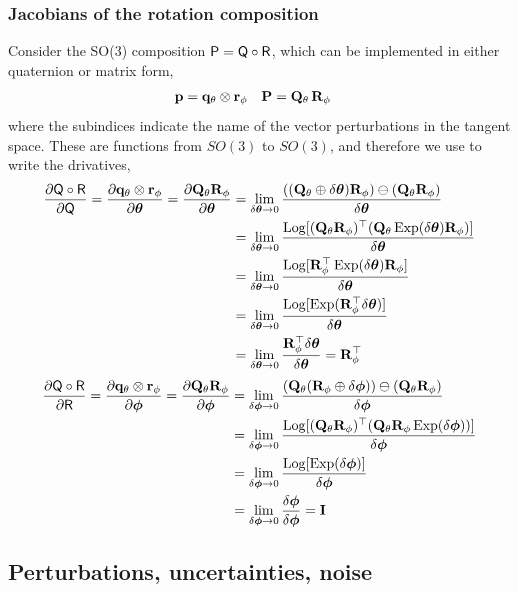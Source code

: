 \subsubsection{Jacobians of the rotation composition}

Consider the SO(3) composition $\mathsf P=\mathsf Q\circ\mathsf R$, which can be implemented in either quaternion or matrix form,
%
\begin{align}
{\bf p} &= {\bf q}_\theta\otimes{\bf r}_\phi & {\bf P} &= {\bf Q}_\theta\,{\bf R}_\phi
\end{align}
%
where the subindices indicate the name of the vector perturbations in the tangent space. 
These are functions from $SO(3)$ to $SO(3)$, and therefore we use  to write the drivatives,
%
\begin{align*}
\frac{\partial\mathsf Q\circ\mathsf R}{\partial\mathsf Q} 
= \frac{\partial{\bf q}_\theta\otimes{\bf r}_\phi}{\partial{\bm \theta}} 
= \frac{\partial{\bf Q}_\theta {\bf R}_\phi}{\partial{\bm \theta}} 
&= \lim_{\delta{\bm \theta}\to 0}\frac{(({\bf Q}_\theta\oplus\delta{\bm \theta}){\bf R}_\phi)\ominus({\bf Q}_\theta{\bf R}_\phi)}{\delta{\bm \theta}} \\
&= \lim_{\delta{\bm \theta}\to 0}\frac{\operatorname*{Log}[({\bf Q}_\theta{\bf R}_\phi)^{\top}({\bf Q}_\theta\operatorname*{Exp}(\delta{\bm \theta}){\bf R}_\phi)]}{\delta{\bm \theta}} \\
&= \lim_{\delta{\bm \theta}\to 0}\frac{\operatorname*{Log}[{\bf R}_\phi^{\top}\operatorname*{Exp}(\delta{\bm \theta}){\bf R}_\phi]}{\delta{\bm \theta}} \\
&= \lim_{\delta{\bm \theta}\to 0}\frac{\operatorname*{Log}[\operatorname*{Exp}({\bf R}_\phi^{\top}\delta{\bm \theta})]}{\delta{\bm \theta}} \\
&= \lim_{\delta{\bm \theta}\to 0}\frac{{\bf R}_\phi^{\top}\delta{\bm \theta}}{\delta{\bm \theta}}  = {\bf R}_\phi^{\top} 
\end{align*}
%
\begin{align*}
\frac{\partial\mathsf Q\circ\mathsf R}{\partial\mathsf R} 
= \frac{\partial{\bf q}_\theta\otimes{\bf r}_\phi}{\partial{\bm \phi}} 
= \frac{\partial{\bf Q}_\theta {\bf R}_\phi}{\partial{\bm \phi}} 
&= \lim_{\delta{\bm \phi}\to 0}\frac{({\bf Q}_\theta({\bf R}_\phi\oplus\delta{\bm \phi}))\ominus({\bf Q}_\theta{\bf R}_\phi)}{\delta{\bm \phi}} \\
&= \lim_{\delta{\bm \phi}\to 0}\frac{\operatorname*{Log}[({\bf Q}_\theta{\bf R}_\phi)^{\top}({\bf Q}_\theta{\bf R}_\phi\operatorname*{Exp}(\delta{\bm \phi}))]}{\delta{\bm \phi}} \\
&= \lim_{\delta{\bm \phi}\to 0}\frac{\operatorname*{Log}[\operatorname*{Exp}(\delta{\bm \phi})]}{\delta{\bm \phi}} \\
&= \lim_{\delta{\bm \phi}\to 0}\frac{\delta{\bm \phi}}{\delta{\bm \phi}}  = {\bf I} 
\end{align*}

\subsection{Perturbations, uncertainties, noise}

